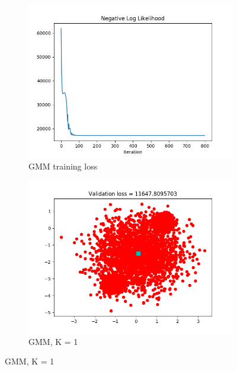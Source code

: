 \documentclass[12pt,letterpaper]{article}
\begin{document}
\begin{figure}
    \centering
    \begin{subfigure}[b]{0.45\textwidth}
        \includegraphics[width=\textwidth]{imgs/gmm_train_loss.png}
        \caption{GMM training loss}
        \label{GMM_loss}
    \end{subfigure}
    \begin{subfigure}[b]{0.45\textwidth}
        \includegraphics[width=\textwidth]{imgs/GMM_K_1.png}
        \caption{GMM, K = 1}
        \label{GMM_1}
    \end{subfigure}


\end{figure}
\end{document}
